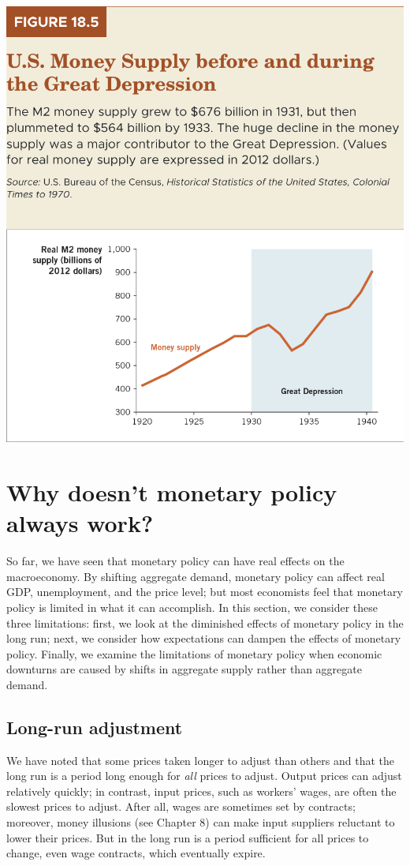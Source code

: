 \documentclass[11pt]{article} %
\begin{document}
\begin{center}
\includegraphics[scale=0.5]{images/Figure 18.5.png} 
\end{center}

\section*{\textbf{Why doesn't monetary policy always work?}}
So far, we have seen that monetary policy can have real effects on the macroeconomy. By shifting aggregate demand, monetary policy can affect real GDP, unemployment, and the price level; but most economists feel that monetary policy is limited in what it can accomplish. In this section, we consider these three limitations: first, we look at the diminished effects of monetary policy in the long run; next, we consider how expectations can dampen the effects of monetary policy. Finally, we examine the limitations of monetary policy when economic downturns are caused by shifts in aggregate supply rather than aggregate demand.

\subsection*{Long-run adjustment}
We have noted that some prices taken longer to adjust than others and that the long run is a period long enough for \textit{all} prices to adjust. Output prices can adjust relatively quickly; in contrast, input prices, such as workers' wages, are often the slowest prices to adjust. After all, wages are sometimes set by contracts; moreover, money illusions (see Chapter 8) can make input suppliers reluctant to lower their prices. But in the long run is a period sufficient for all prices to change, even wage contracts, which eventually expire.
\end{document}
